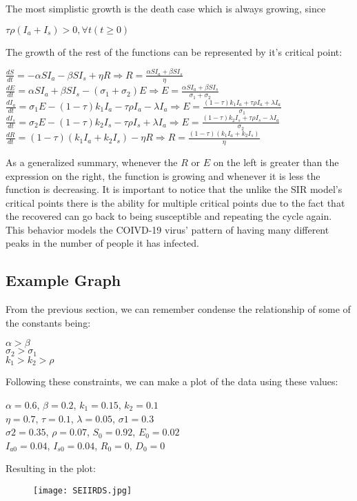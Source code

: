 \documentclass[12pt]{article} %
\begin{document}
The most simplistic growth is the death case which is always growing, since \begin{center} $\tau \rho (I_a + I_s) > 0, \forall t (t\geq0)$\end{center}

The growth of the rest of the functions can be represented by it's critical point:
\begin{center}
$\frac{dS}{dt} = -\alpha SI_a -\beta SI_s + \eta R \Rightarrow R = \frac{\alpha SI_a +\beta SI_s}{\eta}$\\
$\frac{dE}{dt} = \alpha SI_a + \beta SI_s - (\sigma_1 + \sigma_2) E \Rightarrow E = \frac{\alpha SI_a + \beta SI_s}{\sigma_1 + \sigma_2}$\\
$\frac{dI_a}{dt} = \sigma_1 E - (1-\tau)k_1 I_a-\tau \rho I_a - \lambda I_a \Rightarrow E = \frac{(1-\tau)k_1 I_a+\tau \rho I_a + \lambda I_a }{\sigma_1}$\\
$\frac{dI_s}{dt} = \sigma_2 E - (1-\tau)k _2I_s-\tau \rho I_s + \lambda I_a \Rightarrow E = \frac{ (1-\tau)k _2I_s+\tau \rho I_s - \lambda I_a}{\sigma_2}$\\
$\frac{dR}{dt} = (1-\tau)(k_1I_a + k_2 I_s) - \eta R \Rightarrow R = \frac{(1-\tau)(k_1I_a + k_2 I_s)}{\eta}$\\
\end{center}

As a generalized summary, whenever the $R$ or $E$ on the left is greater than the expression on the right, the function is growing and whenever it is less the function is decreasing. It is important to notice that the unlike the SIR model's critical points there is the ability for multiple critical points due to the fact that the recovered can go back to being susceptible and repeating the cycle again. This behavior models the COIVD-19 virus' pattern of having many different peaks in the number of people it has infected.

\subsection{Example Graph}
From the previous section, we can remember condense the relationship of some of the constants being:
\begin{center}
$\alpha > \beta$\\
$\sigma_2 > \sigma_1$\\
$k_1 > k_2 > \rho$
\end{center}

Following these constraints, we can make a plot of the data using these values:
\begin{center}
$\alpha = 0.6$,
$\beta = 0.2$,
$k_1 = 0.15$,
$k_2 = 0.1$\\
$\eta = 0.7$,
$\tau = 0.1$,
$\lambda = 0.05$,
$\sigma1 = 0.3$\\
$\sigma2 = 0.35$,
$\rho = 0.07$,
$S_0 = 0.92$,
$E_0 = 0.02$\\
$I_{a0} = 0.04$,
$I_{s0} = 0.04$,
$R_0 = 0$,
$D_0 = 0$\\
\end{center}
\pagebreak
Resulting in the plot:
\begin{figure}[h!]
\centering
\texttt{[image: SEIIRDS.jpg]}
\end{figure}
\end{document}
